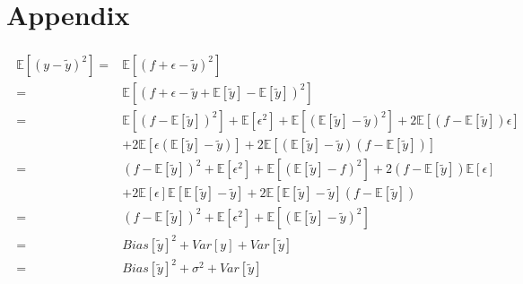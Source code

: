 \onecolumn
\setcounter{equation}{0}
\renewcommand\theequation{A.\arabic{equation}}
\section*{Appendix}
\label{sec:appendix}

\begin{align}\label{eq:derivation_bias_variance}
\begin{split}
	\mathds{E}[(y-\tilde{y})^2] =& \mathds{E}[(f+\epsilon - \tilde{y})^2] \\
	=& \mathds{E}[\left(f+\epsilon - \tilde{y} + \mathds{E}[\tilde{y}] - \mathds{E}[\tilde{y}]\right)^2] \\
	=& \mathds{E}[(f-\mathds{E}[\tilde{y}])^2] + \mathds{E}[\epsilon^2] + \mathds{E}[(\mathds{E}[\tilde{y}]-\tilde{y})^2] + 2\mathds{E}[(f-\mathds{E}[\tilde{y}])\epsilon] \\
	&+ 2\mathds{E}[\epsilon(\mathds{E}[\tilde{y}]-\tilde{y})] + 2\mathds{E}[(\mathds{E}[\tilde{y}]-\tilde{y})(f-\mathds{E}[\tilde{y}])] \\
	=& (f-\mathds{E}[\tilde{y}])^2 + \mathds{E}[\epsilon^2] + \mathds{E}[(\mathds{E}[\tilde{y}]-f)^2] + 2(f-\mathds{E}[\tilde{y}])\mathds{E}[\epsilon] \\
	&+ 2\mathds{E}[\epsilon]\mathds{E}[\mathds{E}[\tilde{y}]-\tilde{y}] + 2\mathds{E}[\mathds{E}[\tilde{y}]-\tilde{y}](f-\mathds{E}[\tilde{y}]) \\
	=& (f-\mathds{E}[\tilde{y}])^2 + \mathds{E}[\epsilon^2] + \mathds{E}[(\mathds{E}[\tilde{y}]-\tilde{y})^2] \\
	=& Bias[\tilde{y}]^2 + Var[y] + Var[\tilde{y}] \\
	=& Bias[\tilde{y}]^2 + \sigma^2 + Var[\tilde{y}]
\end{split}
\end{align}
